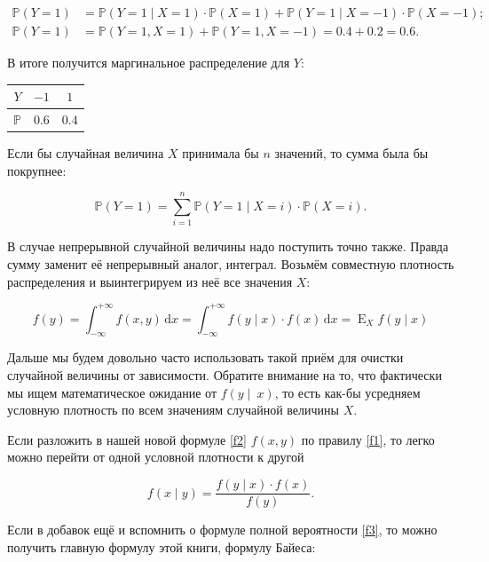 \documentclass[12pt, a4paper, oneside]{extreport}
\DeclareMathOperator{\E}{\mathop{E}}
\def \mbb{\mathbb}
\def \PP{\mbb{P}}
\newcommand{\dx}[1]{\,\mathrm{d}#1} %
\theoremstyle{plain}              %
\theoremstyle{definition}         %
\begin{document}
\begin{equation*}
\begin{aligned}
 \PP(Y=1) &= \PP(Y=1 \mid X=1) \cdot \PP(X=1) + \PP(Y=1 \mid X = -1) \cdot \PP(X = -1);\\
  \PP(Y=1) &=   \PP(Y=1, X=1) + \PP(Y=1,X=-1) = 0.4 + 0.2 = 0.6.
  \end{aligned}
 \end{equation*}

 В итоге получится маргинальное распределение для $Y$: 

\begin{center}
\begin{tabular}{c|c|c}
$Y $ &  $-1$    &  $1$     \\ \hline
$\PP$&  	$0.6$   &  $0.4$   \\
\end{tabular}
\end{center}

Если бы случайная величина $X$ принимала бы $n$ значений, то сумма была бы покрупнее: 

\[
\PP(Y=1) = \sum_{i=1}^n \PP(Y = 1 \mid X = i) \cdot \PP(X = i).
\]

В случае непрерывной случайной величины надо поступить точно также. Правда сумму заменит её непрерывный аналог, интеграл. Возьмём совместную плотность распределения и выинтегрируем из неё все значения $X$:

\begin{equation}\label{f3}
f(y) = \int_{-\infty}^{+\infty} f(x,y) \dx{x} = \int_{-\infty}^{+\infty} f(y \mid x) \cdot f(x) \dx{x} = \E_{X} f(y \mid x)
\end{equation}

Дальше мы будем довольно часто использовать такой приём для очистки случайной величины от зависимости. Обратите внимание на то, что фактически мы ищем математическое ожидание от $f(y\mid~x)$, то есть как-бы усредняем условную плотность по всем значениям случайной величины $X$.

Если разложить в нашей новой формуле \eqref{f2} $f(x,y)$ по правилу \eqref{f1}, то легко можно перейти от одной условной плотности к другой

\begin{equation}
f(x \mid y) = \frac{ f(y \mid x) \cdot f(x)}{f(y)}.
\end{equation}

Если в добавок ещё и вспомнить о формуле полной вероятности \eqref{f3}, то можно получить главную формулу этой книги, формулу Байеса:
\end{document}
